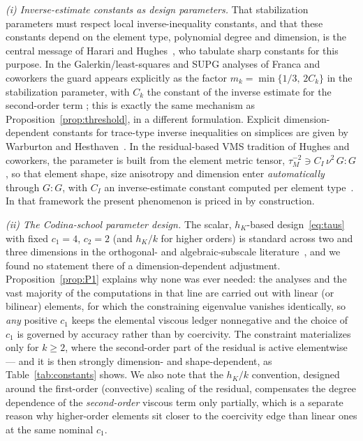 \documentclass[11pt,a4paper]{article}
\theoremstyle{remark}
\begin{document}
\emph{(i) Inverse-estimate constants as design parameters.} That
stabilization parameters must respect local inverse-inequality
constants, and that these constants depend on the element type,
polynomial degree and dimension, is the central message of Harari and
Hughes~\cite{HarariHughes1992}, who tabulate sharp constants for this
purpose. In the Galerkin/least-squares and SUPG analyses of Franca and
coworkers the guard appears explicitly as the factor $m_k =
\min\{1/3,\,2C_k\}$ in the stabilization parameter, with $C_k$ the
constant of the inverse estimate for the second-order term
\cite{FrancaFrey1992}; this is exactly the same mechanism as
Proposition~\ref{prop:threshold}, in a different formulation. Explicit
dimension-dependent constants for trace-type inverse inequalities on
simplices are given by Warburton and
Hesthaven~\cite{WarburtonHesthaven2003}. In the residual-based VMS
tradition of Hughes and coworkers, the parameter is built from the
element metric tensor, $\tau_M^{-2} \ni C_I\,\nu^2\, G\!:\!G$, so that
element shape, size anisotropy and dimension enter \emph{automatically}
through $G\!:\!G$, with $C_I$ an inverse-estimate constant computed per
element type~\cite{Bazilevs2007}. In that framework the present
phenomenon is priced in by construction.

\emph{(ii) The Codina-school parameter design.} The scalar,
$h_K$-based design~\eqref{eq:taus} with fixed $c_1 = 4$, $c_2 = 2$
(and $h_K/k$ for higher orders) is standard across two and three
dimensions in the orthogonal- and algebraic-subscale
literature~\cite{Codina2000,Codina2002,CodinaVMSChapter}, and we found
no statement there of a dimension-dependent adjustment.
Proposition~\ref{prop:P1} explains why none was ever needed: the
analyses and the vast majority of the computations in that line are
carried out with linear (or bilinear) elements, for which the
constraining eigenvalue vanishes identically, so \emph{any} positive
$c_1$ keeps the elemental viscous ledger nonnegative and the choice of
$c_1$ is governed by accuracy rather than by coercivity. The
constraint materializes only for $k \ge 2$, where the second-order
part of the residual is active elementwise --- and it is then strongly
dimension- and shape-dependent, as Table~\ref{tab:constants} shows.
We also note that the $h_K/k$ convention, designed around the
first-order (convective) scaling of the residual, compensates the
degree dependence of the \emph{second-order} viscous term only
partially, which is a separate reason why higher-order elements sit
closer to the coercivity edge than linear ones at the same nominal
$c_1$.
\end{document}
